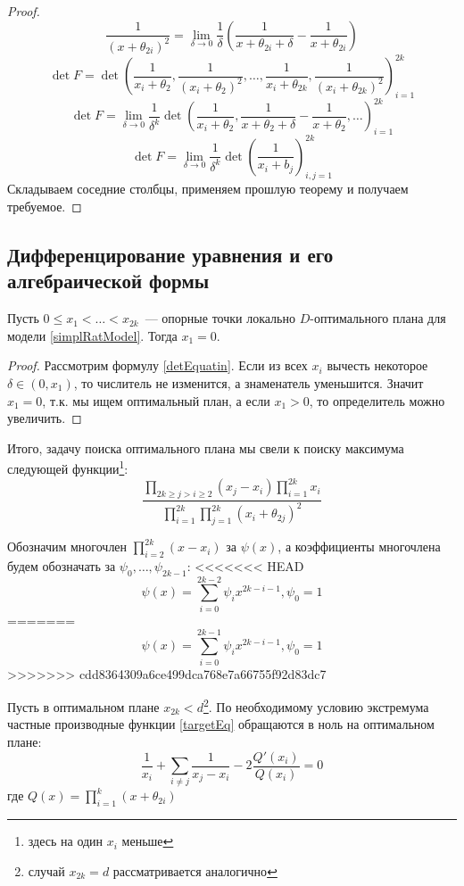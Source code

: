 \begin{proof}
$$ \frac{1}{(x + \theta_{2i})^2} = \lim\limits_{\delta \rightarrow 0} \frac{1}{\delta}\left(\frac{1}{x+\theta_{2i}+\delta} - \frac{1}{x+\theta_{2i}}\right)$$
$$\det F = \det \left(\frac{1}{x_i + \theta_2}, \frac{1}{(x_i + \theta_2)^2}, …, \frac{1}{x_i+\theta_{2k}}, \frac{1}{(x_i + \theta_{2k})^2} \right)_{i=1}^{2k}$$
$$ \det F = \lim \limits_{\delta \rightarrow 0} \frac{1}{\delta^k} \det \left(\frac{1}{x_i + \theta_2}, \frac{1}{x+\theta_{2}+\delta} - \frac{1}{x+\theta_{2}}, … \right)_{i=1}^{2k}$$
$$\det F = \lim \limits_{\delta \rightarrow 0} \frac{1}{\delta^k}\det \left( \frac{1}{x_i + b_j} \right)_{i,j=1}^{2k}$$
Складываем соседние столбцы, применяем прошлую теорему и получаем требуемое.
\end{proof}

\subsection{Дифференцирование уравнения и его алгебраической формы}

\begin{thm}
    Пусть $0 \leq x_1 < … < x_{2k}$ — опорные точки локально $D$-оптимального плана для модели \eqref{simplRatModel}.  Тогда $x_1 = 0$.
\end{thm}
\begin{proof}
Рассмотрим формулу \eqref{detEquatin}. Если из всех $x_i$ вычесть некоторое $\delta \in (0, x_1)$, то числитель не изменится, а знаменатель уменьшится. Значит $x_1 = 0$, т.к. мы ищем оптимальный план, а если $x_1 >0$, то определитель можно увеличить.
\end{proof}

Итого, задачу поиска оптимального плана мы свели к поиску максимума следующей функции\footnote{здесь на один $x_i$ меньше}:
\begin{equation}
\label{targetEq}
\frac{\prod\limits_{2k\ge j>i\ge2}(x_j - x_i) \prod_{i=1}^{2k} x_i}{\prod\limits_{i=1}^{2k}\prod\limits_{j=1}^{2k} (x_i + \theta_{2j})^2}
\end{equation}

Обозначим многочлен $\prod\limits_{i=2}^{2k}(x-x_i)$ за $\psi(x)$, а коэффициенты многочлена будем обозначать за $\psi_0, …, \psi_{2k-1}$:
<<<<<<< HEAD
$$\psi(x) = \sum\limits_{i=0}^{2k-2}\psi_i x^{2k-i-1}, \psi_0 = 1$$
=======
$$\psi(x) = \sum\limits_{i=0}^{2k-1}\psi_i x^{2k-i-1}, \psi_0 = 1$$
>>>>>>> cdd8364309a6ce499dca768e7a66755f92d83dc7

Пусть в оптимальном плане $x_{2k} < d$\footnote{случай $x_{2k}=d$ рассматривается аналогично}. По необходимому условию экстремума частные производные   функции \eqref{targetEq} обращаются в ноль на оптимальном плане:
$$ \frac{1}{x_i} + \sum\limits_{i\neq j} \frac{1}{x_j- x_i} - 2 \frac{Q'(x_i)}{Q(x_i)} = 0$$
где $Q(x)= \prod_{i=1}^k(x+\theta_{2i})$ 

